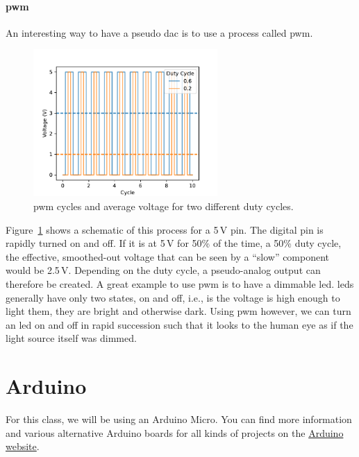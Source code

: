 \paragraph{\Ac{pwm}} An interesting way to have a pseudo \ac{dac} is to use a process called \acf{pwm}. 
\begin{figure}[tb]
    \centering
    \includegraphics[width=0.625\textwidth]{graphics/00_introduction/pwm.pdf}
    \caption{\Ac{pwm} cycles and average voltage for two different duty cycles.}
    \label{fig:intro:pwm}
\end{figure}
Figure~\ref{fig:intro:pwm} shows a schematic of this process for a 5\,V pin. The digital pin is rapidly turned on and off. If it is at 5\,V for 50\% of the time, a 50\% duty cycle, the effective, smoothed-out voltage that can be seen by a ``slow'' component would be 2.5\,V. Depending on the duty cycle, a pseudo-analog output can therefore be created. A great example to use \ac{pwm} is to have a dimmable \ac{led}. \acp{led} generally have only two states, on and off, i.e., is the voltage is high enough to light them, they are bright and otherwise dark. Using \ac{pwm} however, we can turn an \ac{led} on and off in rapid succession such that it looks to the human eye as if the light source itself was dimmed.


\section{Arduino}

For this class, we will be using an Arduino Micro. You can find more information and various alternative Arduino boards for all kinds of projects on the \href{https://www.arduino.cc}{Arduino website}.

